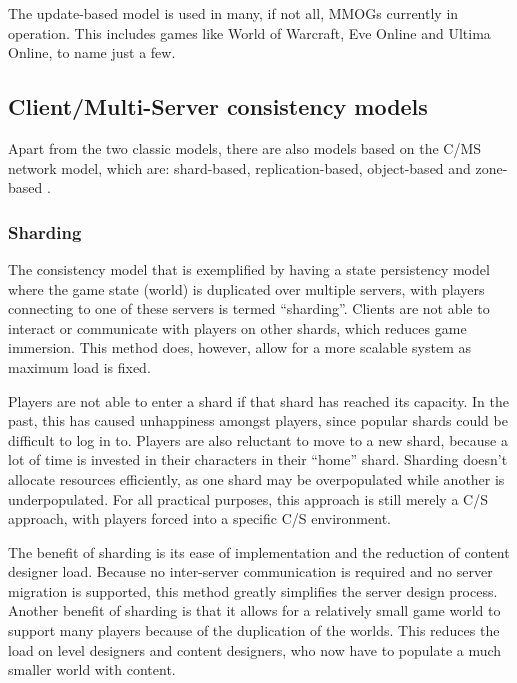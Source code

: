 The update-based model is used in many, if not all, MMOGs currently in operation. This includes games like World of Warcraft, Eve Online and Ultima
Online, to name just a few.

\subsection{Client/Multi-Server consistency models}
\label{cms_models}


Apart from the two classic models, there are also models based on the C/MS network model, which are: shard-based, replication-based, object-based and
zone-based \cite{Hu_voronoi_IM}.

\subsubsection{Sharding}

The consistency model that is exemplified by having a state persistency model where the game state (world) is duplicated over multiple servers, with
players connecting to one of these servers is termed ``sharding''. Clients are not able to interact or communicate with players on other shards,
which reduces game immersion. This method does, however, allow for a more scalable system as maximum load is fixed.

Players are not able to enter a shard if that shard has reached its capacity. In the past, this has caused unhappiness amongst players, since popular
shards could be difficult to log in to. Players are also reluctant to move to a new shard, because a lot of time is invested in their characters in
their ``home'' shard. Sharding doesn't allocate resources efficiently, as one shard may be overpopulated while another is underpopulated. For all
practical purposes, this approach is still merely a C/S approach, with players forced into a specific C/S environment.

The benefit of sharding is its ease of implementation and the reduction of content designer load. Because no inter-server communication is required
and no server migration is supported, this method greatly simplifies the server design process. Another benefit of sharding is that it allows for a
relatively small game world to support many players because of the duplication of the worlds. This reduces the load on level designers and content
designers, who now have to populate a much smaller world with content.

